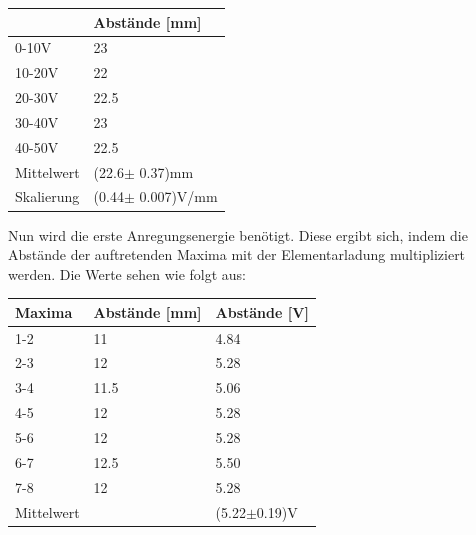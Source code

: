 \begin{minipage}{\linewidth}
    \begin{table}[H]
        \centering
    
    \begin{tabular}{ll}
        \toprule
         & Abstände [mm]\\
        \midrule
        0-10V & 23 \\
        10-20V & 22 \\
        20-30V & 22.5 \\
        30-40V & 23 \\
        40-50V & 22.5 \\
        \midrule
        Mittelwert& (22.6$\pm$ 0.37)mm \\
        Skalierung& (0.44$\pm$ 0.007)V/mm  \\       
    \end{tabular}
    \label{tab:5}
    \end{table}
\end{minipage}

\noindent Nun wird die erste Anregungsenergie benötigt. Diese ergibt sich, indem die Abstände der auftretenden Maxima mit der Elementarladung multipliziert werden.
Die Werte sehen wie folgt aus:

\begin{minipage}{\linewidth}
    \begin{table}[H]
        \centering
    
    \begin{tabular}{lll}
        \toprule
        Maxima & Abstände [mm] & Abstände [V]\\
        \midrule
        1-2 & 11 &   4.84 \\
        2-3 & 12 &   5.28\\
        3-4 & 11.5 & 5.06\\
        4-5 & 12 &   5.28\\
        5-6 & 12 &   5.28\\
        6-7 & 12.5 & 5.50\\
        7-8 & 12 &   5.28\\
        \midrule
        Mittelwert & & (5.22$\pm$0.19)V      
    \end{tabular}
    \label{tab:4}
    \end{table}
\end{minipage}

